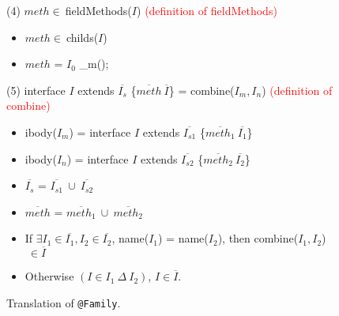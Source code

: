 \begin{figure*}
\begin{itemize}
    \end{itemize}
(4) $meth\in\ $\textsf{fieldMethods(}$I$\textsf{)} \textcolor{red}{(definition of fieldMethods)}
    \begin{itemize}
    \item $meth\in\ $\textsf{childs(}$I$\textsf{)}
    \item $meth$ = $I_0$\textsf{ \_m();}
    \end{itemize}
(5) \textsf{interface }$I$\textsf{ extends }$\overline{I_s}$\textsf{ \{}$\overline{meth}\ \overline{I}$\textsf{\}} = \textsf{combine(}$I_m,I_n$\textsf{)} \textcolor{red}{(definition of combine)}
    \begin{itemize}
    \item \textsf{ibody(}$I_m$\textsf{)} = \textsf{interface }$I$\textsf{ extends }$\overline{I_{s1}}$\textsf{ \{}$\overline{meth_1}\ \overline{I_1}$\textsf{\}}
    \item \textsf{ibody(}$I_n$\textsf{)} = \textsf{interface }$I$\textsf{ extends }$\overline{I_{s2}}$\textsf{ \{}$\overline{meth_2}\ \overline{I_2}$\textsf{\}}
    \item $\overline{I_s}$ = $\overline{I_{s1}}\ \cup\ \overline{I_{s2}}$
    \item $\overline{meth}$ = $\overline{meth_1}\ \cup\ \overline{meth_2}$
    \item If $\exists I_1\in\overline{I_1}, I_2\in\overline{I_2}$, \textsf{name(}$I_1$\textsf{)} = \textsf{name(}$I_2$\textsf{)}, then \textsf{combine(}$I_1,I_2$\textsf{)}$\ \in\overline{I}$
    \item Otherwise $(I\in I_1\ \Delta\ I_2)$, $I\in\overline{I}$.
    \end{itemize}
\caption{Translation of \lstinline{@Family}.}
\label{fig:trans1}
\end{figure*}

